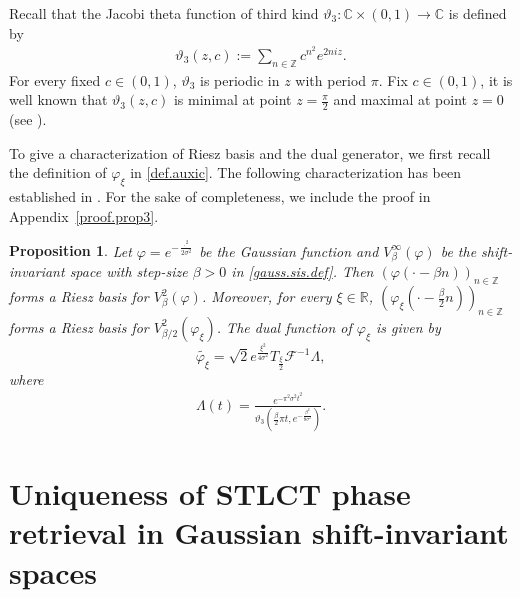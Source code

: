 \documentclass[11pt, reqno]{amsart}
\newtheorem{proposition}[theorem]{Proposition}%
\newcommand{\Z}{\mathbb{Z}}
\newcommand{\R}{\mathbb{R}}
\newcommand{\C}{\mathbb{C}}
\numberwithin{equation}{section}
\begin{document}
    

    Recall that the Jacobi theta function of third kind $\vartheta_3:\C\times (0,1) \to \C$ is defined by
	\begin{align}\label{eq.theta}
		\vartheta_3(z,c):= \sum_{n\in \Z} c^{n^2} e^{2niz}.
	\end{align}
	For every fixed $c\in (0,1)$, $\vartheta_3$ is periodic in $z$ with period $\pi$. Fix $c\in (0,1)$, it is well known that $\vartheta_3(z,c)$ is minimal at point $z= \frac{\pi}{2}$ and maximal at point $z= 0$ (see \cite[p.~178]{janssen1996some}). 

    

 To give a characterization of Riesz basis and the dual generator, we first recall the definition of $\varphi_\xi$ in \eqref{def.auxic}.  The following characterization has been established  in \cite{grohs2024stable}. For the sake of completeness, we include the proof in Appendix~\ref{proof.prop3}.

     
     
    \begin{proposition}\label{prop3}
      Let $\varphi=e^{-\frac{\cdot^2}{2\sigma^2}}$ be the Gaussian function  and $V_{\beta}^{\infty}(\varphi)$ be the shift-invariant space with step-size $\beta>0$ in \eqref{gauss.sis.def}. Then  $(\varphi(\cdot - \beta n))_{n\in \Z}$ forms a Riesz basis for $V_{\beta}^{2}(\varphi)$. 
Moreover, for every $\xi\in \R$, $(\varphi_\xi(\cdot - \frac{\beta}{2} n))_{n\in \Z}$ forms a Riesz basis for $V_{\beta/2}^{2}(\varphi_\xi)$. The dual function of $\varphi_\xi$ is  given by
\begin{equation}\label{dual.phi_w}
\widetilde{\varphi_\xi} = \sqrt{2} e^{\frac{\xi^2}{4\sigma^2}} T_{\frac{\xi}{2}} \mathcal{F}^{-1} \Lambda,
\end{equation} 
where
        \begin{align}\label{lambda.eq}
		\Lambda(t) = \frac{e^{-\pi^2 \sigma^2 t^2}}{\vartheta_3(\frac{\beta}{2}\pi t, e^{-\frac{\beta^2}{8\sigma^2}})}.
	\end{align}
    \end{proposition}

    
  \medskip  

	
    
   

\section{Uniqueness of STLCT phase retrieval in Gaussian shift-invariant spaces}\label{uniq.sec}
\end{document}

